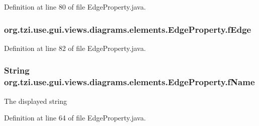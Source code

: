 Definition at line 80 of file Edge\-Property.\-java.

\hypertarget{classorg_1_1tzi_1_1use_1_1gui_1_1views_1_1diagrams_1_1elements_1_1_edge_property_aece930865643399bc7ab765f6acde472}{
\subsubsection[{f\-Edge}]{ org.\-tzi.\-use.\-gui.\-views.\-diagrams.\-elements.\-Edge\-Property.\-f\-Edge\hspace{0.3cm}{\ttfamily [protected]}}}\label{classorg_1_1tzi_1_1use_1_1gui_1_1views_1_1diagrams_1_1elements_1_1_edge_property_aece930865643399bc7ab765f6acde472}


Definition at line 82 of file Edge\-Property.\-java.

\hypertarget{classorg_1_1tzi_1_1use_1_1gui_1_1views_1_1diagrams_1_1elements_1_1_edge_property_a9c5ec6756431132e74e227f1c253dea2}{
\subsubsection[{f\-Name}]{\setlength{\rightskip}{0pt plus 5cm}String org.\-tzi.\-use.\-gui.\-views.\-diagrams.\-elements.\-Edge\-Property.\-f\-Name\hspace{0.3cm}{\ttfamily [protected]}}}\label{classorg_1_1tzi_1_1use_1_1gui_1_1views_1_1diagrams_1_1elements_1_1_edge_property_a9c5ec6756431132e74e227f1c253dea2}
The displayed string 

Definition at line 64 of file Edge\-Property.\-java.

